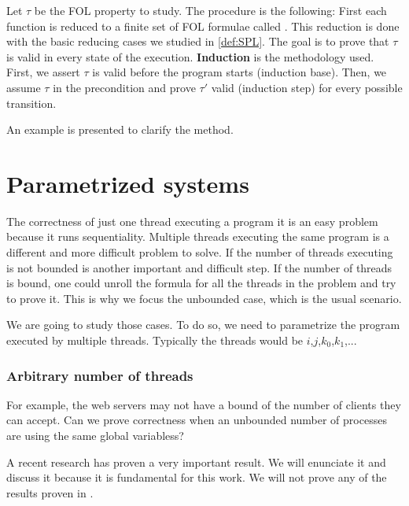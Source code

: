 Let $\tau$ be the \gls{FOL} property to study. 
%
The procedure is the following:
%
First each function is reduced to a finite set of \gls{FOL} formulae called .
%
This reduction is done with the basic reducing cases we studied in \ref{def:SPL}.
%
The goal is to prove that $\tau$ is valid in every state of the execution.
%
\textbf{Induction} is the methodology used.
%
First, we assert $\tau$ is valid before the program starts (induction base).
%
Then, we assume $\tau$ in the precondition and prove $\tau'$ valid (induction step) for every possible transition.


An example is presented to clarify the method.

\begin{example}

\end{example}




\section{Parametrized systems}

The correctness of just one thread executing a program it is an easy problem because it runs sequentiality.
%
Multiple threads executing the same program is a different and more difficult problem to solve.
%
If the number of threads executing is not bounded is another important and difficult step.
%
If the number of threads is bound, one could unroll the formula for all the threads in the problem and try to prove it. 
%
This is why we focus the unbounded case, which is the usual scenario.

We are going to study those cases. 
%
To do so, we need to parametrize the program executed by multiple threads.
%
Typically the threads would be $i$,$j$,$k_0$,$k_1$,... 
%
\subsubsection{Arbitrary number of threads}

For example, the web servers may not have a bound of the number of clients they can accept.
%
Can we prove correctness when an unbounded number of processes are using the same global variabless?

A recent research  has proven a very important result. 
%
We will enunciate it and discuss it because it is fundamental for this work. 
%
We will not prove any of the results proven in \citep{paperParametrizedInvariants}.


